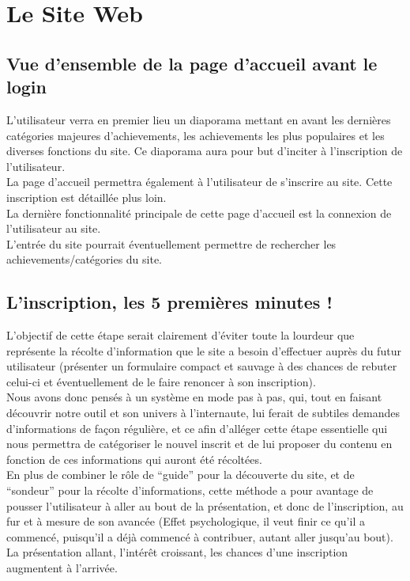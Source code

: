 \documentclass{life-fr}
\begin{document}
\section{Le Site Web}

\subsection{Vue d'ensemble de la page d'accueil avant le login}

L'utilisateur verra en premier lieu un diaporama mettant en avant les dernières catégories majeures d'achievements, les achievements les plus populaires et les diverses fonctions du site. Ce diaporama aura pour but d'inciter à l'inscription de l'utilisateur.\\

La page d'accueil permettra également à l'utilisateur de s'inscrire au site. Cette inscription est détaillée plus loin.\\

La dernière fonctionnalité principale de cette page d'accueil est la connexion de l'utilisateur au site.\\

L'entrée du site pourrait éventuellement permettre de rechercher les achievements/catégories du site.

\subsection{L'inscription, les 5 premières minutes !}

L'objectif de cette étape serait clairement d'éviter toute la lourdeur que représente la récolte d'information que le site a besoin d'effectuer auprès du futur utilisateur (présenter un formulaire compact et sauvage à des chances de rebuter celui-ci et éventuellement de le faire renoncer à son inscription).\\

Nous avons donc pensés à un système en mode pas à pas, qui, tout en faisant découvrir notre outil et son univers à l'internaute, lui ferait de subtiles demandes d'informations de façon régulière, et ce afin d'alléger cette étape essentielle qui nous permettra de catégoriser le nouvel inscrit et de lui proposer du contenu en fonction de ces informations qui auront été récoltées.\\

En plus de combiner le rôle de “guide” pour la découverte du site, et de “sondeur” pour la récolte d'informations, cette méthode a pour avantage de pousser l'utilisateur à aller au bout de la présentation, et donc de l'inscription, au fur et à mesure de son avancée (Effet psychologique, il veut finir ce qu'il a commencé, puisqu'il a déjà commencé à contribuer, autant aller jusqu'au bout). La présentation allant, l'intérêt croissant, les chances d'une inscription augmentent à l'arrivée.\\
\\
\end{document}
